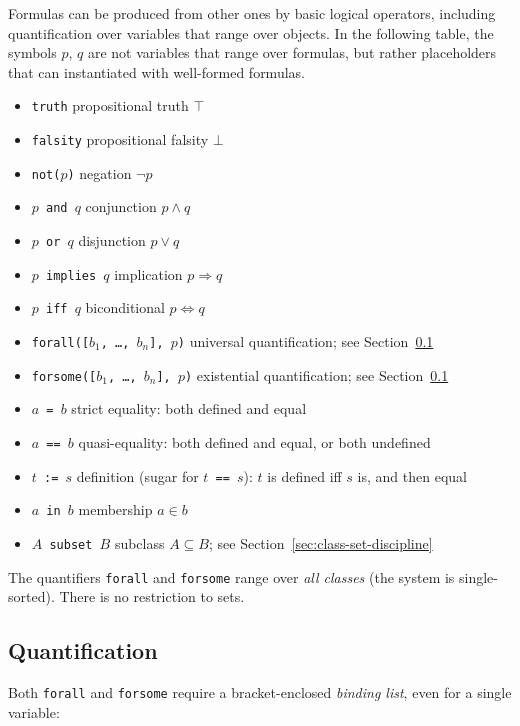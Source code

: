 Formulas can be produced from other ones by basic logical operators,
including quantification over variables that range over objects.
%
In the following table, the symbols $p$, $q$ are not variables that
range over formulas, but rather placeholders that can instantiated
with well-formed formulas.

\begin{itemize}
\item \texttt{truth} propositional truth $\top$
\item \texttt{falsity} propositional falsity $\bot$
\item \texttt{not($p$)} negation $\lnot p$
\item \texttt{$p$ and $q$} conjunction $p \land q$
\item \texttt{$p$ or $q$} disjunction $p \lor q$
\item \texttt{$p$ implies $q$} implication $p \Rightarrow q$
\item \texttt{$p$ iff $q$} biconditional $p \Leftrightarrow q$
\item \texttt{forall([$b_1$, \ldots, $b_n$], $p$)} universal quantification; see Section~\ref{sec:multiquant}
\item \texttt{forsome([$b_1$, \ldots, $b_n$], $p$)} existential quantification; see Section~\ref{sec:multiquant}
\item \texttt{$a$ = $b$} strict equality: both defined and equal
\item \texttt{$a$ == $b$} quasi-equality: both defined and equal, or both undefined
\item \texttt{$t$ := $s$} definition (sugar for \texttt{$t$ == $s$}): $t$ is defined iff $s$ is, and then equal
\item \texttt{$a$ in $b$} membership $a \in b$
\item \texttt{$A$ subset $B$} subclass $A \subseteq B$; see Section~\ref{sec:class-set-discipline}
\end{itemize}

\noindent
The quantifiers \texttt{forall} and \texttt{forsome} range over \emph{all
classes} (the system is single-sorted).  There is no restriction to sets.

\subsection{Quantification}
\label{sec:multiquant}

Both \texttt{forall} and \texttt{forsome} require a bracket-enclosed
\emph{binding list}, even for a single variable:

